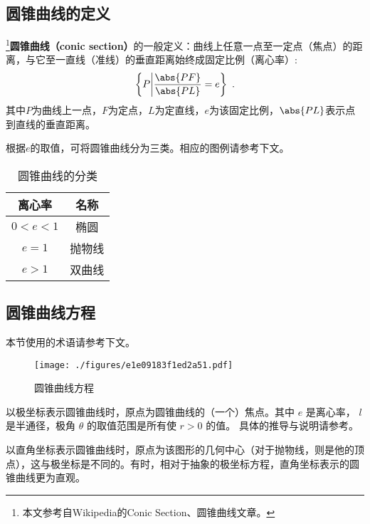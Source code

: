 
\begin{issues}
\issueDraft
\end{issues}

\subsection{圆锥曲线的定义}
\footnote{本文参考自Wikipedia的Conic Section、圆锥曲线文章。}\textbf{圆锥曲线（conic section）}的一般定义：曲线上任意一点至一定点（焦点）的距离，与它至一直线（准线）的垂直距离始终成固定比例（离心率）:
\begin{equation}
\left \{P \middle| \frac{\abs{PF}}{\abs{PL}}=e \right \}~.
\end{equation}
其中$P$为曲线上一点，$F$为定点，$L$为定直线，$e$为该固定比例，$\abs{PL}$表示点到直线的垂直距离。

根据$e$的取值，可将圆锥曲线分为三类。相应的图例请参考下文。
\begin{table}[ht]
\centering
\caption{圆锥曲线的分类}\label{tab_conic_2}
\begin{tabular}{|c|c|}
\hline
离心率 & 名称\\
\hline
$0<e<1$ & 椭圆\\
\hline
$e=1$ & 抛物线\\
\hline
$e>1$ & 双曲线\\
\hline
\end{tabular}
\end{table}


\subsection{圆锥曲线方程}
本节使用的术语请参考下文。
\begin{figure}[ht]
\centering
\texttt{[image: ./figures/e1e09183f1ed2a51.pdf]}
\caption{圆锥曲线方程} \label{fig_conic_1}
\end{figure}

以极坐标表示圆锥曲线时，原点为圆锥曲线的（一个）焦点。其中 $e$ 是离心率， $l$ 是半通径，极角 $\theta$ 的取值范围是所有使 $r>0$ 的值。 
具体的推导与说明请参考。

以直角坐标表示圆锥曲线时，原点为该图形的几何中心（对于抛物线，则是他的顶点），这与极坐标是不同的。有时，相对于抽象的极坐标方程，直角坐标表示的圆锥曲线更为直观。

